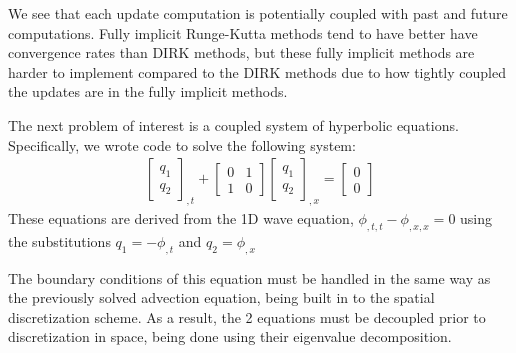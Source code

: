 \documentclass[12pt]{article}
\begin{document}
We see that each update computation is potentially coupled with past and future computations.
Fully implicit Runge-Kutta methods tend to have better have convergence rates than DIRK methods, but these fully implicit methods are harder to implement compared to the DIRK methods due to how tightly coupled the updates are in the fully implicit methods. 

The next problem of interest is a coupled system of hyperbolic equations.
Specifically, we wrote code to solve the following system:
\begin{align*}
	\begin{bmatrix}
		q_1\\
		q_2
	\end{bmatrix}_{,t} + 
	\begin{bmatrix}
		0 & 1 \\
		1 & 0
	\end{bmatrix}
	\begin{bmatrix}
		q_1 \\
		q_2
	\end{bmatrix}_{,x} = 
	\begin{bmatrix}
		0 \\
		0
	\end{bmatrix}
\end{align*}
These equations are derived from the 1D wave equation, $\phi_{,t,t} - \phi_{,x,x} = 0$ using the substitutions $q_1 = -\phi_{,t}$ and $q_2 = \phi_{,x}$

The boundary conditions of this equation must be handled in the same way as the previously solved advection equation, being built in to the spatial discretization scheme.
As a result, the 2 equations must be decoupled prior to discretization in space, being done using their eigenvalue decomposition.
\end{document}
